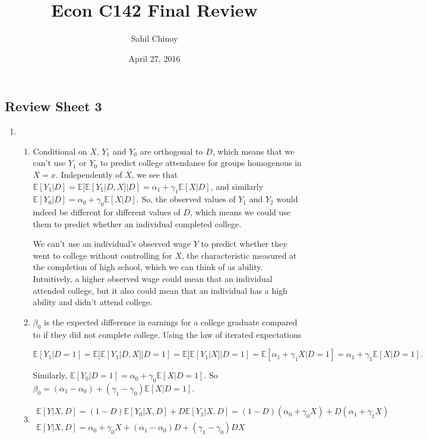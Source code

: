 \documentclass{article}
\title{Econ C142 Final Review}
\author{Sahil Chinoy}
\date{April 27, 2016}
\begin{document}
\subsection*{Review Sheet 3}

\begin{enumerate}

	\item

	\begin{enumerate}

		\item

		Conditional on $X$, $Y_1$ and $Y_0$ are orthogonal to $D$, which means that we can't use $Y_1$ or $Y_0$ to predict college attendance for groups homogenous in $X = x$. Independently of $X$, we see that $\mathbb{E}[Y_1|D] = \mathbb{E}[\mathbb{E}[Y_1|D,X]|D] = \alpha_1 + \gamma_1\mathbb{E}[X|D]$, and similarly $\mathbb{E}[Y_0|D] = \alpha_0 + \gamma_0\mathbb{E}[X|D]$. So, the observed values of $Y_1$ and $Y_2$ would indeed be different for different values of $D$, which means we could use them to predict whether an individual completed college.

		We can't use an individual's observed wage $Y$ to predict whether they went to college without controlling for $X$, the characteristic measured at the completion of high school, which we can think of as ability. Intuitively, a higher observed wage could mean that an individual attended college, but it also could mean that an individual has a high ability and didn't attend college.

		\item

		$\beta_0$ is the expected difference in earnings for a college graduate compared to if they did not complete college. Using the law of iterated expectations

		\begin{equation*}
		\mathbb{E}[Y_1|D=1] = \mathbb{E}[\mathbb{E}[Y_1|D,X]|D=1] = \mathbb{E}[\mathbb{E}[Y_1|X]|D=1] = \mathbb{E}[\alpha_1 + \gamma_1 X|D=1] = \alpha_1 + \gamma_1 \mathbb{E}[X|D=1].
		\end{equation*}

		Similarly, $\mathbb{E}[Y_0|D=1] = \alpha_0 + \gamma_0 \mathbb{E}[X|D=1]$. So $\beta_0 = (\alpha_1 - \alpha_0) + (\gamma_1 - \gamma_0) \mathbb{E}[X|D=1]$.

		\item 

		\begin{gather*}\mathbb{E}[Y|X,D] = (1-D)\mathbb{E}[Y_0|X,D] + D \mathbb{E}[Y_1|X,D] = (1-D)(\alpha_0 + \gamma_0 X) + D (\alpha_1 + \gamma_1 X) \\
		\mathbb{E}[Y|X,D] = \alpha_0 + \gamma_0 X + (\alpha_1 - \alpha_0)D + (\gamma_1 - \gamma_0)DX
		\end{gather*}


\end{enumerate}
\end{enumerate}
\end{document}

